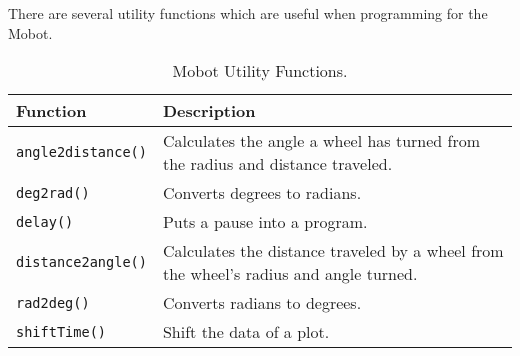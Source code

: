 \noindent
There are several utility functions which are useful when programming for
the Mobot. 

\begin{table}[!h]
\begin{center}
\caption{Mobot Utility Functions.}
\begin{tabular}{p{38 mm}p{110 mm}}
\hline
Function & Description \\
\hline
\texttt{angle2distance()} & Calculates the angle a wheel has turned from the
radius and distance traveled.\\
\texttt{deg2rad()} & Converts degrees to radians. \\
\texttt{delay()} & Puts a pause into a program. \\
\texttt{distance2angle()} & Calculates the distance traveled by a wheel from the wheel's radius and angle turned.\\
\texttt{rad2deg()} & Converts radians to degrees.\\
\texttt{shiftTime()} & Shift the data of a plot.\\
\hline
\end{tabular}
\end{center}
\label{mobilec_api_cbinary}
\end{table}

\clearpage
\newpage






